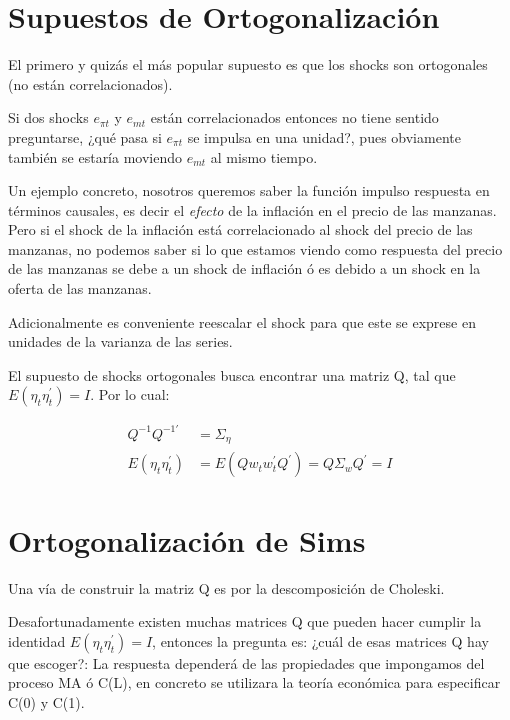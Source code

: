 \documentclass[
]{book}
\begin{document}
\hypertarget{supuestos-de-ortogonalizaciuxf3n}{%
\section{Supuestos de Ortogonalización}\label{supuestos-de-ortogonalizaciuxf3n}}

El primero y quizás el más popular supuesto es que los shocks son ortogonales (no están correlacionados).

Si dos shocks \(e_{\pi t}\) y \(e_{mt}\) están correlacionados entonces no tiene sentido preguntarse, ¿qué pasa si \(e_{\pi t}\) se impulsa en una unidad?, pues obviamente también se estaría moviendo \(e_{mt}\) al mismo tiempo.

Un ejemplo concreto, nosotros queremos saber la función impulso respuesta en términos causales, es decir el \emph{efecto} de la inflación en el precio de las manzanas. Pero si el shock de la inflación está correlacionado al shock del precio de las manzanas, no podemos saber si lo que estamos viendo como respuesta del precio de las manzanas se debe a un shock de inflación ó es debido a un shock en la oferta de las manzanas.

Adicionalmente es conveniente reescalar el shock para que este se exprese en unidades de la varianza de las series.

El supuesto de shocks ortogonales busca encontrar una matriz Q, tal que \(E(\eta_{t}\eta_{t}^{'})=I\). Por lo cual:

\begin{align}
Q^{-1}Q^{-1'}&=\Sigma_{\eta} \\
E(\eta_{t}\eta_{t}^{'})&=E(Qw_{t}w_{t}^{'}Q^{'})=Q\Sigma_{w} Q^{'}=I\nonumber
\end{align}

\hypertarget{ortogonalizaciuxf3n-de-sims}{%
\section{Ortogonalización de Sims}\label{ortogonalizaciuxf3n-de-sims}}

Una vía de construir la matriz Q es por la descomposición de Choleski.

Desafortunadamente existen muchas matrices Q que pueden hacer cumplir la identidad \(E(\eta_{t}\eta_{t}^{'})=I\), entonces la pregunta es: ¿cuál de esas matrices Q hay que escoger?: La respuesta dependerá de las propiedades que impongamos del proceso MA ó C(L), en concreto se utilizara la teoría económica para especificar C(0) y C(1).
\end{document}
